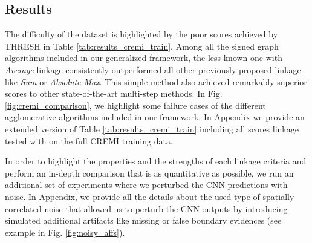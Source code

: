 


\subsection{Results}\label{sec:results}
 The difficulty of the dataset is highlighted by the poor scores achieved by THRESH in Table \ref{tab:results_cremi_train}. Among all the signed graph algorithms included in our generalized framework, the less-known one with \emph{Average} linkage consistently outperformed all other previously proposed linkage like \emph{Sum} or \emph{Absolute Max}. This simple method also achieved remarkably superior scores to other state-of-the-art multi-step methods. 
In Fig. \ref{fig:cremi_comparison}, we highlight some failure cases of the different agglomerative algorithms included in our framework. In Appendix we provide an extended version of Table \ref{tab:results_cremi_train} including all scores linkage tested with \algname{} on the full CREMI training data. 

In order to highlight the properties and the strengths of each linkage criteria and  perform an in-depth comparison that is as quantitative as possible, we run an additional set of experiments where we perturbed the CNN predictions with noise. In Appendix, we provide all the details about the used type of spatially correlated noise that allowed us to perturb the CNN outputs by introducing simulated additional artifacts like missing or false boundary evidences (see example in Fig. \ref{fig:noisy_affs}).  

